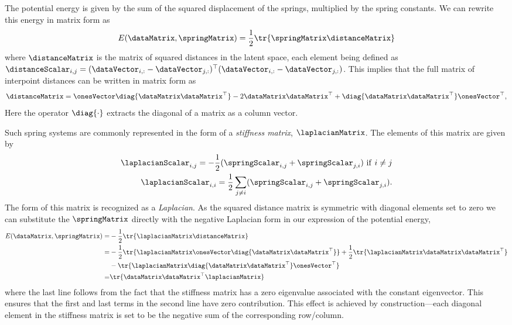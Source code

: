 The potential energy is given by the sum of the squared displacement
of the springs, multiplied by the spring constants. We can rewrite
this energy in matrix form as
\[
E(\dataMatrix, \springMatrix) = \frac{1}{2}\tr{\springMatrix \distanceMatrix}
\]
where $\distanceMatrix$ is the matrix of squared distances in the
latent space, each element being defined as
$\distanceScalar_{i,j}=(\dataVector_{i,:} -
\dataVector_{j,:})^\top(\dataVector_{i,:} - \dataVector_{j,:})$. This implies
that the full matrix of interpoint distances can be written in matrix
form as 
\begin{align}
  \distanceMatrix = \onesVector\diag{\dataMatrix\dataMatrix^\top}-
  2\dataMatrix\dataMatrix^\top
  +\diag{\dataMatrix\dataMatrix^\top}\onesVector^\top,\label{eq:distanceDefinition}
\end{align}
Here the operator $\diag{\cdot}$ extracts the diagonal of a matrix as
a column vector.

Such spring systems are commonly represented in the form of a
\emph{stiffness matrix}, $\laplacianMatrix$. The elements of this
matrix are given by
\begin{align}
  \laplacianScalar_{i,j}=-\frac{1}{2}(\springScalar_{i,j}+\springScalar_{j,
  i}) \,\,\mathrm{if}\,\,i\neq j \label{eqn:diagonalLaplacian}\\
\laplacianScalar_{i,i}=\frac{1}{2}\sum_{j\neq
  i} (\springScalar_{i,j} + \springScalar_{j,i}). \label{eqn:offdiagonalLaplacian}
\end{align}
The form of this matrix is recognized as a \emph{Laplacian}. As the
squared distance matrix is symmetric with diagonal elements set to
zero we can substitute the $\springMatrix$ directly with the negative
Laplacian form in our expression of the potential energy,
\begin{align*}
  E(\dataMatrix, \springMatrix) =& -\frac{1}{2}\tr{\laplacianMatrix\distanceMatrix}\\
  =&-\frac{1}{2}\tr{\laplacianMatrix\onesVector\diag{\dataMatrix\dataMatrix^\top}}+ \frac{1}{2}\tr{\laplacianMatrix \dataMatrix\dataMatrix^\top}\\& -\tr{\laplacianMatrix \diag{\dataMatrix\dataMatrix^\top}\onesVector^\top}\\
  =&\tr{\dataMatrix\dataMatrix^\top\laplacianMatrix }
\end{align*}
where the last line follows from the fact that the stiffness matrix
has a zero eigenvalue associated with the constant eigenvector. This
ensures that the first and last terms in the second line have zero
contribution. This effect is achieved by construction---each diagonal
element in the stiffness matrix is set to be the negative sum of the
corresponding row/column.

